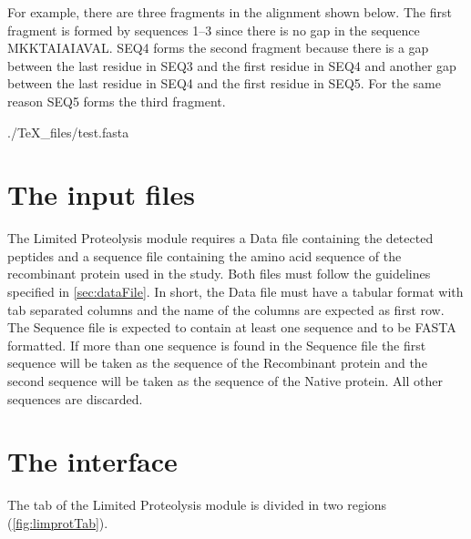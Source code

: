 For example, there are three fragments in the alignment shown below. The first fragment
is formed by sequences \numrange{1}{3} since there is no gap in the sequence MKKTAIAIAVAL.
SEQ\num{4} forms the second fragment because there is a gap between the last residue
in SEQ\num{3} and the first residue in SEQ\num{4} and another gap between the last
residue in SEQ\num{4} and the first residue in SEQ\num{5}. For the same reason
SEQ\num{5} forms the third fragment.

\begin{texshade}{./TeX_files/test.fasta}
    \hideconsensus
\end{texshade}

\section{The input files}

The Limited Proteolysis module requires a Data file containing the detected peptides
and a sequence file containing the amino acid sequence of the recombinant protein
used in the study. Both files must follow the guidelines specified in \autoref{sec:dataFile}.
In short, the Data file must have a tabular format with tab separated columns and
the name of the columns are expected as first row. The Sequence file is expected
to contain at least one sequence and to be FASTA formatted. If more than one sequence
is found in the Sequence file the first sequence will be taken as the sequence of
the Recombinant protein and the second sequence will be taken as the sequence of
the Native protein. All other sequences are discarded.

\section{The interface}

The tab of the Limited Proteolysis module is divided in two regions (\autoref{fig:limprotTab}).

